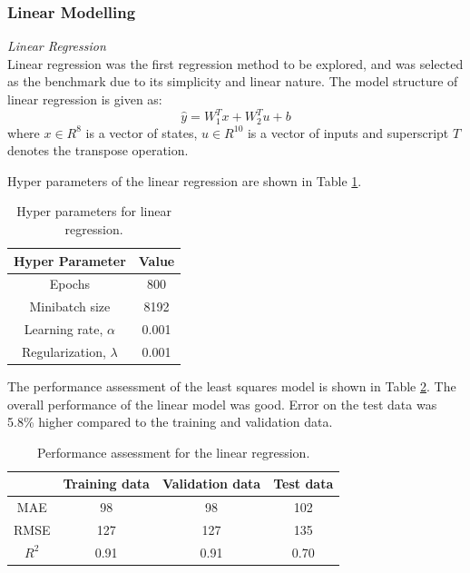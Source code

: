 %
%
\subsubsection{Linear Modelling}
\noindent
\textit{Linear Regression} \\
Linear regression was the first regression method to be explored, and was selected as the benchmark due to its simplicity and linear nature. The model structure of linear regression is given as:
\begin{equation}
    \hat{y} = W_1^Tx + W_2^Tu + b
    \label{eq:08LS}
\end{equation}
where $x \in R^8$ is a vector of states, $u \in R^{10}$ is a vector of inputs and superscript $T$ denotes the transpose operation.

Hyper parameters of the linear regression are shown in Table \ref{tab:08LSHparameters}.
\begin{table}[h]
    \centering
    {
    \begin{tabular}{ c | c}
        Hyper Parameter                  &  Value       \\
        \hline
        Epochs                           &  800      \\
        Minibatch size                   &  8192     \\
        Learning rate, $\alpha$          &  0.001    \\
        Regularization, $\lambda$          &  0.001  \\
    \end{tabular}}
    \caption{Hyper parameters for linear regression.}
    \label{tab:08LSHparameters}
\end{table}

The performance assessment of the least squares model is shown in Table \ref{tab:08LSperformance}. The overall performance of the linear model was good. Error on the test data was 5.8\% higher compared to the training and validation data.
\begin{table}[h]
    \centering
    {
    \begin{tabular}{ c | c | c | c}
                             &  Training data    &  Validation data   &    Test data      \\
        \hline
        MAE                  &  98               &    98              &  102     \\
        RMSE                 &  127              &   127              &  135    \\ 
        $R^2$                &  0.91             &   0.91             &  0.70   \\
    \end{tabular}}
    \caption{Performance assessment for the linear regression.}
    \label{tab:08LSperformance}
\end{table}

